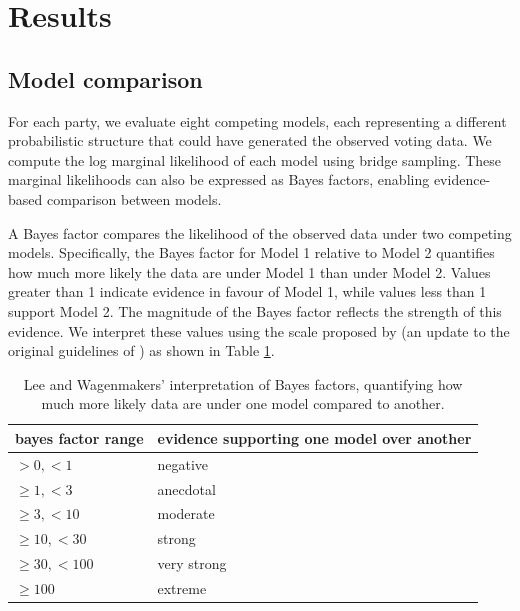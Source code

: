 \documentclass[webpdf,large,contemporary,namedate]{oup-authoring-template}
\theoremstyle{thmstyleone}
\theoremstyle{thmstyletwo}
\theoremstyle{thmstylethree}
\begin{document}
\section{Results}\label{results}

\subsection{Model comparison}\label{model-comparison}

For each party, we evaluate eight competing models, each representing a
different probabilistic structure that could have generated the observed
voting data. We compute the log marginal likelihood of each model using
bridge sampling. These marginal likelihoods can also be expressed as
Bayes factors, enabling evidence-based comparison between models.

A Bayes factor compares the likelihood of the observed data under two
competing models. Specifically, the Bayes factor for Model 1 relative to
Model 2 quantifies how much more likely the data are under Model 1 than
under Model 2. Values greater than 1 indicate evidence in favour of
Model 1, while values less than 1 support Model 2. The magnitude of the
Bayes factor reflects the strength of this evidence. We interpret these
values using the scale proposed by \citet{Lee2014} (an update to the
original guidelines of \citet{jeffreys1939}) as shown in Table
\ref{tab:tablewagenmakers}.

\begin{table}

\caption{\label{tab:tablewagenmakers}Lee and Wagenmakers' interpretation of Bayes factors, quantifying how much more likely data are under one model compared to another.}
\centering
\fontsize{8}{10}\selectfont
\begin{tabular}[t]{l|l}
\hline
bayes factor range & evidence supporting one model over another\\
\hline
$> 0, < 1$ & negative\\
\hline
$\geq 1, < 3$ & anecdotal\\
\hline
$\geq 3, < 10$ & moderate\\
\hline
$\geq 10, < 30$ & strong\\
\hline
$\geq 30, < 100$ & very strong\\
\hline
$\geq 100$ & extreme\\
\hline
\end{tabular}
\end{table}
\end{document}
